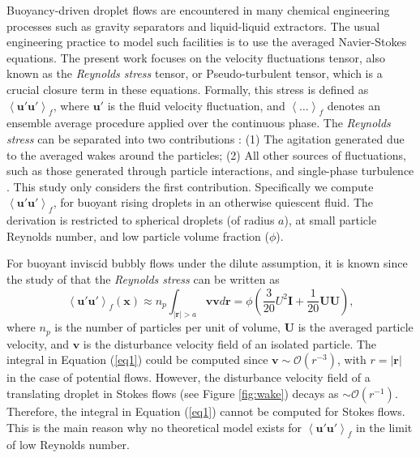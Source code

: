 \documentclass[a4paper,11pt]{article}
\newcommand{\avg}[1]{\left<#1\right>}
\theoremstyle{mytheoremstyle}
\theoremstyle{mytheoremstyle}
\theoremstyle{myproblemstyle}
\begin{document}
Buoyancy-driven droplet flows are encountered in many chemical engineering processes such as gravity separators and liquid-liquid extractors. 
The usual engineering practice to model such facilities is to use the averaged Navier-Stokes equations. 
The present work focuses on the velocity fluctuations tensor, also known as the \textit{Reynolds stress} tensor, or Pseudo-turbulent tensor, which is a crucial closure term in these equations.
Formally, this stress is defined as $\avg{ \textbf{u}' \textbf{u}'}_f$, where $\textbf{u}'$ is the fluid velocity fluctuation, and $\avg{\ldots}_f$ denotes an ensemble average procedure applied over the continuous phase. 
The \textit{Reynolds stress} can be separated into two contributions : (1) The agitation generated due to the averaged wakes around the particles; (2) All other sources of fluctuations, such as those generated through particle interactions, and single-phase turbulence \cite{du2022analysis}.
This study only considers the first contribution. 
Specifically we compute $\avg{ \textbf{u}' \textbf{u}'}_f$, for buoyant rising droplets in an otherwise quiescent fluid. 
The derivation is restricted to spherical droplets (of radius $a$), at small particle Reynolds number, and low particle volume fraction ($\phi$). 


For buoyant inviscid bubbly flows under the dilute assumption, it is known since the study of \cite{van1982bubble} that the \textit{Reynolds stress} can be written as
\begin{equation}
    \avg{\textbf{u}'\textbf{u}'}_f (\textbf{x})
    \approx
    n_p \int_{|\textbf{r}| > a}\textbf{v}\textbf{v}  d\textbf{r}
    = \phi \left(\frac{3}{20} U^2\textbf{I} + \frac{1}{20} \textbf{UU} \right),
    \label{eq1}
\end{equation}
where $n_p$ is the number of particles per unit of volume, $\textbf{U}$ is the averaged particle velocity, and $\textbf{v}$ is the disturbance velocity field of an isolated particle. 
The integral in Equation (\ref{eq1}) could be computed since $\textbf{v} \sim \mathcal{O}(r^{-3})$, with $r =|\textbf{r}|$ in the case of potential flows. 
However, the disturbance velocity field of a translating droplet in Stokes flows (see Figure \ref{fig:wake}) decays as $\sim \mathcal{O}(r^{-1})$. 
Therefore, the integral in Equation (\ref{eq1}) cannot be computed for Stokes flows. 
This is the main reason why no theoretical model exists for $\avg{\textbf{u}'\textbf{u}'}_f$ in the limit of low Reynolds number. 
\end{document}
